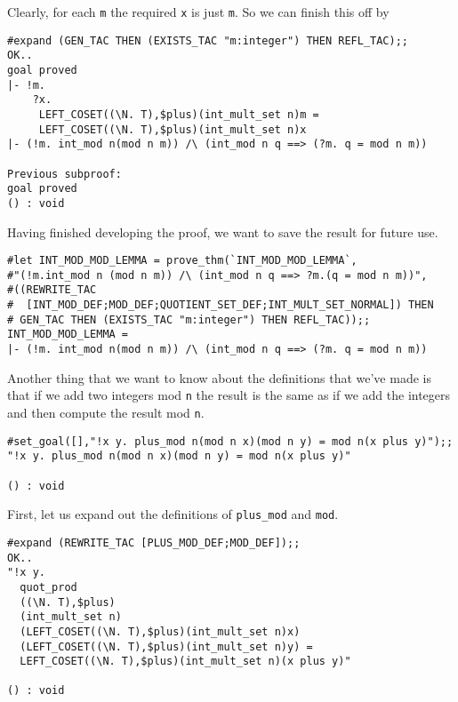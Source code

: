 Clearly, for each {\small\tt m} the required {\small\tt x} is just
{\small\tt m}.  So we can finish this off by
\begin{session}
\begin{verbatim}
#expand (GEN_TAC THEN (EXISTS_TAC "m:integer") THEN REFL_TAC);;
OK..
goal proved
|- !m.
    ?x.
     LEFT_COSET((\N. T),$plus)(int_mult_set n)m =
     LEFT_COSET((\N. T),$plus)(int_mult_set n)x
|- (!m. int_mod n(mod n m)) /\ (int_mod n q ==> (?m. q = mod n m))

Previous subproof:
goal proved
() : void
\end{verbatim}
\end{session}

Having finished developing the proof, we want to save the result for
future use.
\begin{session}
\begin{verbatim}
#let INT_MOD_MOD_LEMMA = prove_thm(`INT_MOD_MOD_LEMMA`,
#"(!m.int_mod n (mod n m)) /\ (int_mod n q ==> ?m.(q = mod n m))",
#((REWRITE_TAC
#  [INT_MOD_DEF;MOD_DEF;QUOTIENT_SET_DEF;INT_MULT_SET_NORMAL]) THEN
# GEN_TAC THEN (EXISTS_TAC "m:integer") THEN REFL_TAC));;
INT_MOD_MOD_LEMMA = 
|- (!m. int_mod n(mod n m)) /\ (int_mod n q ==> (?m. q = mod n m))
\end{verbatim}
\end{session}

Another thing that we want to know about the definitions that we've
made is that if we add two integers mod {\small\tt n} the result is
the same as if we add the integers and then compute the result mod
{\small\tt n}.
\begin{session}
\begin{verbatim}
#set_goal([],"!x y. plus_mod n(mod n x)(mod n y) = mod n(x plus y)");;
"!x y. plus_mod n(mod n x)(mod n y) = mod n(x plus y)"

() : void
\end{verbatim}
\end{session}

First, let us expand out the definitions of {\small\verb+plus_mod+} and
{\small\verb+mod+}.
\begin{session}
\begin{verbatim}
#expand (REWRITE_TAC [PLUS_MOD_DEF;MOD_DEF]);;
OK..
"!x y.
  quot_prod
  ((\N. T),$plus)
  (int_mult_set n)
  (LEFT_COSET((\N. T),$plus)(int_mult_set n)x)
  (LEFT_COSET((\N. T),$plus)(int_mult_set n)y) =
  LEFT_COSET((\N. T),$plus)(int_mult_set n)(x plus y)"

() : void
\end{verbatim}
\end{session}

